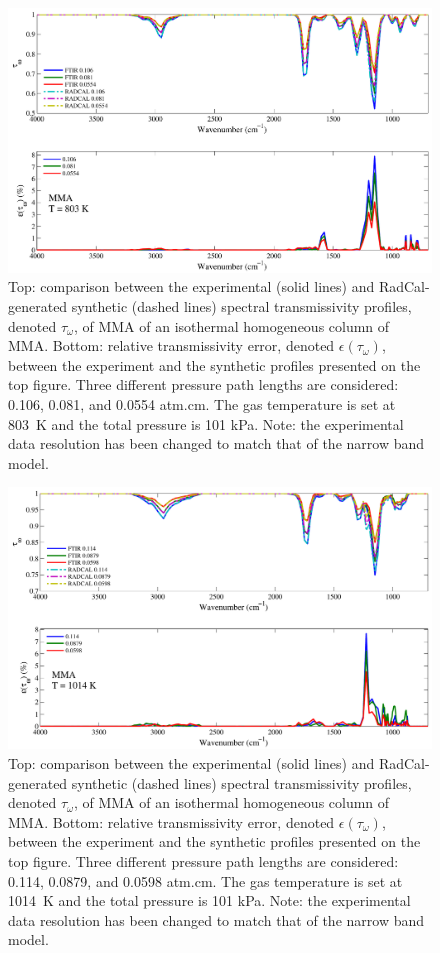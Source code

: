 \begin{figure}[p]
\includegraphics[width=\textwidth]{../Verification/Results_Test2/MMA_803.pdf}
\caption{Top: comparison between the experimental (solid lines) and RadCal-generated synthetic (dashed lines) spectral transmissivity profiles, denoted $\tau_{\omega}$, of MMA of an isothermal homogeneous column of MMA. Bottom: relative transmissivity error, denoted $\epsilon{(\tau_{\omega})}$, between the experiment and the synthetic profiles presented on the top figure. Three different pressure path lengths are considered: 0.106, 0.081, and 0.0554 atm.cm. The gas temperature is set at 803~K and the total pressure is 101 kPa. Note: the experimental data resolution has been changed to match that of the narrow band model. \label{fig:MMA_Verify_803K}}
\end{figure}

\begin{figure}[p]
\includegraphics[width=\textwidth]{../Verification/Results_Test2/MMA_1014.pdf}
\caption{Top: comparison between the experimental (solid lines) and RadCal-generated synthetic (dashed lines) spectral transmissivity profiles, denoted $\tau_{\omega}$, of MMA of an isothermal homogeneous column of MMA. Bottom: relative transmissivity error, denoted $\epsilon{(\tau_{\omega})}$, between the experiment and the synthetic profiles presented on the top figure. Three different pressure path lengths are considered: 0.114, 0.0879, and 0.0598 atm.cm. The gas temperature is set at 1014~K and the total pressure is 101 kPa. Note: the experimental data resolution has been changed to match that of the narrow band model. \label{fig:MMA_Verify_1014K}}
\end{figure}
